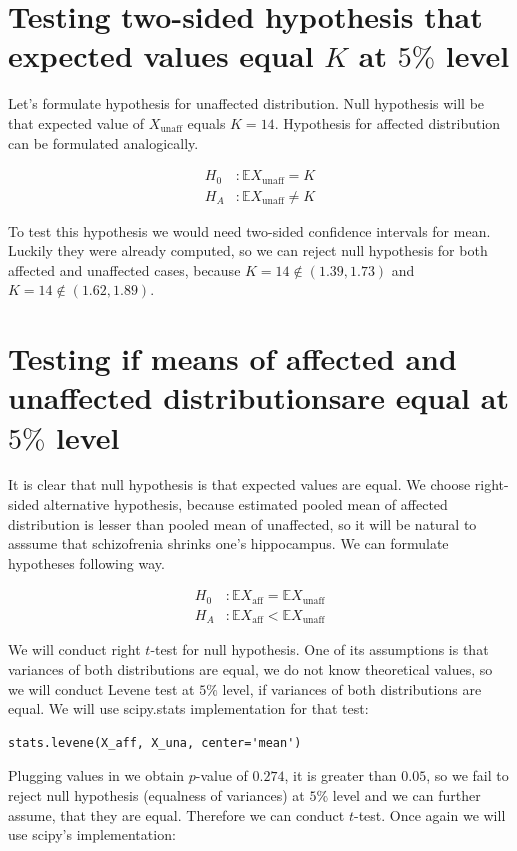 \documentclass[12pt,a4paper]{article} %
\newcommand{\randv}[2][X]{#1_{\text{#2}}}
\newcommand{\E}{\mathbb{E}}
\begin{document}
\section{Testing two-sided hypothesis that expected values equal $K$ at $5\%$ level}

Let's formulate hypothesis for unaffected distribution. Null hypothesis will be that expected value of $\randv{unaff}$ equals $K = 14$. Hypothesis for affected distribution can be formulated analogically.

\begin{align*}
  H_0 &: \E\randv{unaff} = K \\
  H_A &: \E\randv{unaff} \neq K
\end{align*}

To test this hypothesis we would need two-sided confidence intervals for mean. Luckily they were already computed, so we can reject null hypothesis for both affected and unaffected cases, because $K = 14 \not\in (1.39, 1.73)$ and $K = 14 \not\in (1.62, 1.89)$.

\section{Testing if means of affected and unaffected distributionsare  equal at $5\%$ level}

It is clear that null hypothesis is that expected values are equal. We choose right-sided alternative hypothesis, because estimated pooled mean of affected distribution is lesser than pooled mean of unaffected, so it will be natural to asssume that schizofrenia shrinks one's hippocampus. We can formulate hypotheses following way.

\begin{align*}
  H_0 &: \E\randv{aff} = \E\randv{unaff}\\
  H_A &: \E\randv{aff} < \E\randv{unaff}
\end{align*}

We will conduct right $t$-test for null hypothesis. One of its assumptions is that variances of both distributions are equal, we do not know theoretical values, so we will conduct Levene test at $5\%$ level, if variances of both distributions are equal. We will use scipy.stats implementation for that test:

\begin{lstlisting}
stats.levene(X_aff, X_una, center='mean')
\end{lstlisting}

Plugging values in we obtain $p$-value of $0.274$, it is greater than $0.05$, so we fail to reject null hypothesis (equalness of variances) at $5\%$ level and we can further assume, that they are equal. Therefore we can conduct $t$-test. Once again we will use scipy's implementation:
\end{document}
